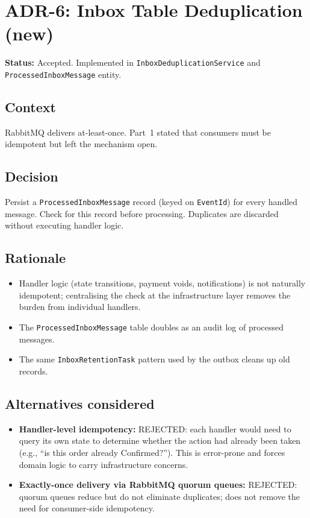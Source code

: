 \section*{ADR-6: Inbox Table Deduplication (new)}

\textbf{Status:} Accepted. Implemented in \texttt{InboxDeduplicationService} and \texttt{ProcessedInboxMessage} entity.

\subsection*{Context}
RabbitMQ delivers at-least-once. Part~1 stated that consumers must be idempotent but left the mechanism open.

\subsection*{Decision}
Persist a \texttt{ProcessedInboxMessage} record (keyed on \texttt{EventId}) for every handled message. Check for this record before processing. Duplicates are discarded without executing handler logic.

\subsection*{Rationale}
\begin{itemize}
    \item Handler logic (state transitions, payment voids, notifications) is not naturally idempotent; centralising the check at the infrastructure layer removes the burden from individual handlers.
    \item The \texttt{ProcessedInboxMessage} table doubles as an audit log of processed messages.
    \item The same \texttt{InboxRetentionTask} pattern used by the outbox cleans up old records.
\end{itemize}

\subsection*{Alternatives considered}
\begin{itemize}
    \item \textbf{Handler-level idempotency:} REJECTED: each handler would need to query its own state to determine whether the action had already been taken (e.g., ``is this order already Confirmed?''). This is error-prone and forces domain logic to carry infrastructure concerns.
    \item \textbf{Exactly-once delivery via RabbitMQ quorum queues:} REJECTED: quorum queues reduce but do not eliminate duplicates; does not remove the need for consumer-side idempotency.
\end{itemize}
